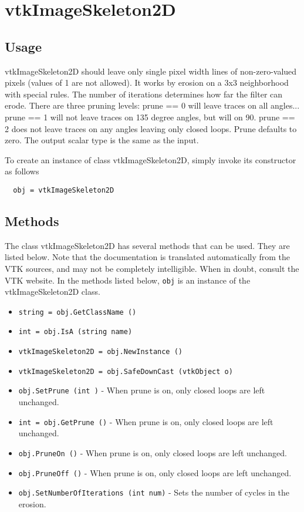 \section{vtkImageSkeleton2D}

\subsection{Usage}

 vtkImageSkeleton2D should leave only single pixel width lines
 of non-zero-valued pixels (values of 1 are not allowed).  
 It works by erosion on a 3x3 neighborhood with special rules.
 The number of iterations determines how far the filter can erode.
 There are three pruning levels:  
  prune == 0 will leave traces on all angles...
  prune == 1 will not leave traces on 135 degree angles, but will on 90.
  prune == 2 does not leave traces on any angles leaving only closed loops.
 Prune defaults to zero. The output scalar type is the same as the input.

To create an instance of class vtkImageSkeleton2D, simply
invoke its constructor as follows
\begin{verbatim}
  obj = vtkImageSkeleton2D
\end{verbatim}
\subsection{Methods}

The class vtkImageSkeleton2D has several methods that can be used.
  They are listed below.
Note that the documentation is translated automatically from the VTK sources,
and may not be completely intelligible.  When in doubt, consult the VTK website.
In the methods listed below, \verb|obj| is an instance of the vtkImageSkeleton2D class.
\begin{itemize}
\item  \verb|string = obj.GetClassName ()|

\item  \verb|int = obj.IsA (string name)|

\item  \verb|vtkImageSkeleton2D = obj.NewInstance ()|

\item  \verb|vtkImageSkeleton2D = obj.SafeDownCast (vtkObject o)|

\item  \verb|obj.SetPrune (int )| -  When prune is on, only closed loops are left unchanged.

\item  \verb|int = obj.GetPrune ()| -  When prune is on, only closed loops are left unchanged.

\item  \verb|obj.PruneOn ()| -  When prune is on, only closed loops are left unchanged.

\item  \verb|obj.PruneOff ()| -  When prune is on, only closed loops are left unchanged.

\item  \verb|obj.SetNumberOfIterations (int num)| -  Sets the number of cycles in the erosion.

\end{itemize}

